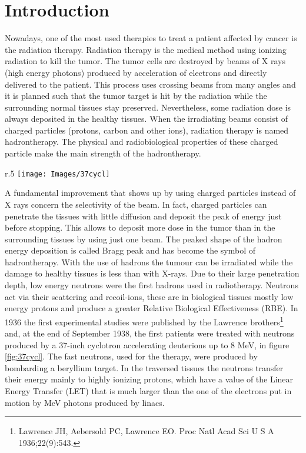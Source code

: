 \documentclass[12pt, a4paper, twoside]{book}
\begin{document}
\chapter{Introduction} %
Nowadays, one of the most used therapies to treat a patient affected by cancer is the radiation therapy. Radiation therapy is the medical method using ionizing radiation to kill the tumor. The tumor cells are destroyed by beams of X rays (high energy photons) produced by acceleration of electrons and directly delivered to the patient. This process uses crossing beams from many angles and it is planned such that the tumor target is hit by the radiation while the surrounding normal tissues stay preserved. Nevertheless, some radiation dose is always deposited in the healthy tissues.
When the irradiating beams consist of charged particles (protons, carbon and other ions), radiation therapy is named hadrontherapy. The physical and radiobiological properties of these charged particle make the main strength of the hadrontherapy.
\begin{wrapfigure}{r}{.5\textwidth}
\centering
{\texttt{[image: Images/37cycl]}}
\caption{E. O. Lawrence (right) and M.S. Livingston (left) standing beside the 37-inch
cyclotron (Berkeley Lab)}
\label{fig:37cycl}
\end{wrapfigure}
A fundamental improvement that shows up by using charged particles instead of X rays concern the selectivity of the beam. In fact, charged particles can penetrate the tissues with little diffusion and deposit the peak of energy just before stopping. This allows to deposit more dose in the tumor than in the surrounding tissues by using just one beam.
The peaked shape of the hadron energy deposition is called Bragg peak and has become the symbol of hadrontherapy. With the use of hadrons the tumour can be irradiated while the damage to healthy tissues is less than with X-rays.
Due to their large penetration depth, low energy neutrons were the first hadrons used in radiotherapy. Neutrons act via their scattering and recoil-ions, these are in biological tissues mostly low energy protons and produce a greater Relative Biological Effectiveness (RBE). 
In 1936 the first experimental studies were published by the Lawrence brothers\footnote{Lawrence JH, Aebersold PC, Lawrence EO. Proc Natl Acad Sci U S A 1936;22(9):543.} and, at the end of September 1938, the first patients were treated with neutrons produced by a 37-inch cyclotron accelerating deuterions up to 8 MeV, in figure \ref{fig:37cycl}. The fast neutrons, used for the therapy, were produced by bombarding a beryllium target. In the traversed tissues the neutrons transfer their energy mainly to highly ionizing protons, which have a value of the Linear Energy Transfer (LET) that is much larger than the one of the electrons put in motion by MeV photons produced by linacs.
\end{document}
